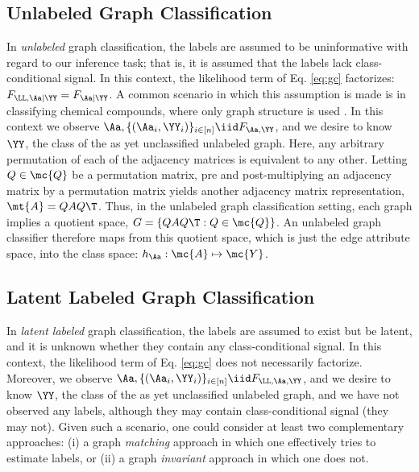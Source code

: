 \documentclass[10pt,journal,cspaper,compsoc]{IEEEtran}
\begin{document}


\subsection{Unlabeled Graph Classification} %
\label{sub:unlabeled_graph_classification}

In \emph{unlabeled} graph classification, the labels are assumed to be uninformative with regard to our inference task; that is, it is assumed that the labels lack class-conditional signal. In this context, the likelihood term of Eq. \eqref{eq:gc} factorizes: $F_{\LL,\Aa|\YY}=F_{\Aa | \YY}$.  A common scenario in which this assumption is made is in classifying chemical compounds, where only graph structure is used \cite{Bunke2011}.  In this context we observe $\Aa, \{(\Aa_i,\YY_i)\}_{i \in [n]} \iid F_{\Aa,\YY}$, and we desire to know $\YY$, the class of the as yet unclassified unlabeled graph.  Here, any arbitrary permutation of each of the adjacency matrices is equivalent to any other.  Letting $Q \in \mc{Q}$ be a permutation matrix, pre and post-multiplying an adjacency matrix by a permutation matrix yields another adjacency matrix representation, $\mt{A}=QAQ\T$.  Thus, in the unlabeled graph classification setting, each graph implies a quotient space,  $G=\{QAQ\T : Q \in \mc{Q}\}$. An unlabeled graph classifier therefore maps from this quotient space, which is just the edge attribute space, into the class space: $h_{\Aa}: \mc{A} \mapsto \mc{Y}$.





\subsection{Latent Labeled Graph Classification} %
\label{sub:latent_labeled_graph_classification}

In \emph{latent labeled} graph classification, the labels are assumed to exist but be latent, and it is unknown whether they contain any class-conditional signal.  In this context, the likelihood term of Eq. \eqref{eq:gc} does not necessarily factorize. Moreover, we observe $\Aa, \{(\Aa_i,\YY_i)\}_{i \in [n]} \iid F_{\LL, \Aa,\YY}$, and we desire to know $\YY$, the class of the as yet unclassified unlabeled graph, and we have not observed any labels, although they may contain class-conditional signal (they may not).  Given such a scenario, one could consider at least two complementary approaches: (i) a graph \emph{matching} approach in which one effectively tries to estimate labels, or (ii) a graph \emph{invariant} approach in which one does not.
\end{document}
